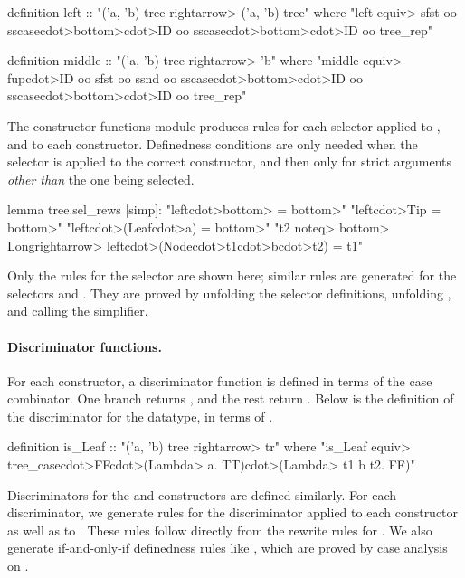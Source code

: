 \begin{isacode}
definition left :: "('a, 'b) tree \<rightarrow> ('a, 'b) tree"
  where "left \<equiv> sfst oo sscase\<cdot>\<bottom>\<cdot>ID oo sscase\<cdot>\<bottom>\<cdot>ID oo tree_rep"
\end{isacode}
\unmedskip
{}
\begin{isacode}
definition middle :: "('a, 'b) tree \<rightarrow> 'b"
  where "middle \<equiv>
    fup\<cdot>ID oo sfst oo ssnd oo sscase\<cdot>\<bottom>\<cdot>ID oo sscase\<cdot>\<bottom>\<cdot>ID oo tree_rep"
\end{isacode}

The constructor functions module produces rules for each selector applied to , and to each constructor. Definedness conditions are only needed when the selector is applied to the correct constructor, and then only for strict arguments \emph{other than} the one being selected.
%
\begin{isacode}
lemma tree.sel_rews [simp]:
  "left\<cdot>\<bottom> = \<bottom>"
  "left\<cdot>Tip = \<bottom>"
  "left\<cdot>(Leaf\<cdot>a) = \<bottom>"
  "t2 \<noteq> \<bottom> \<Longrightarrow> left\<cdot>(Node\<cdot>t1\<cdot>b\<cdot>t2) = t1"
\end{isacode}
%
Only the rules for the selector  are shown here; similar rules are generated for the selectors  and . They are proved by unfolding the selector definitions, unfolding , and calling the simplifier.

\paragraph{Discriminator functions.}

For each constructor, a discriminator function is defined in terms of the case combinator. One branch returns , and the rest return . Below is the definition of the discriminator  for the  datatype, in terms of .
%
\begin{isacode}
definition is_Leaf :: "('a, 'b) tree \<rightarrow> tr"
  where "is_Leaf \<equiv> tree_case\<cdot>FF\<cdot>(\<Lambda> a. TT)\<cdot>(\<Lambda> t1 b t2. FF)"
\end{isacode}

Discriminators for the  and  constructors are defined similarly. For each discriminator, we generate rules for the discriminator applied to each constructor as well as to . These rules follow directly from the rewrite rules for . We also generate if-and-only-if definedness rules like , which are proved by case analysis on .

